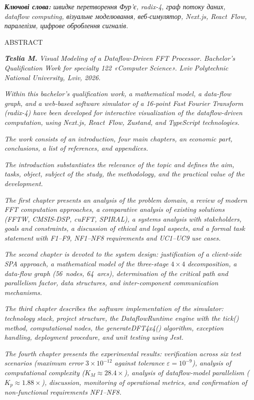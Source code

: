 \emph{\textbf{Ключові слова:} швидке перетворення Фур'є, radix-4, граф
потоку даних, dataflow computing, візуальне моделювання, веб-симулятор,
Next.js, React~Flow, паралелізм, цифрове оброблення сигналів.}

\protect{}\label{_Toc229682901}{}ABSTRACT

\emph{\textbf{Teslia M.} Visual Modeling of a Dataflow-Driven FFT
Processor. Bachelor's Qualification Work for specialty 122 «Computer
Science». Lviv Polytechnic National University, Lviv, 2026.}

\emph{Within this bachelor's qualification work, a mathematical model, a
data-flow graph, and a web-based software simulator of a 16-point Fast
Fourier Transform (radix-4) have been developed for interactive
visualization of the dataflow-driven computation, using Next.js,
React~Flow, Zustand, and TypeScript technologies.}

\emph{The work consists of an introduction, four main chapters, an
economic part, conclusions, a list of references, and appendices.}

\emph{The introduction substantiates the relevance of the topic and
defines the aim, tasks, object, subject of the study, the methodology,
and the practical value of the development.}

\emph{The first chapter presents an analysis of the problem domain, a
review of modern FFT computation approaches, a comparative analysis of
existing solutions (FFTW, CMSIS-DSP, cuFFT, SPIRAL), a systems analysis
with stakeholders, goals and constraints, a discussion of ethical and
legal aspects, and a formal task statement with F1--F9, NF1--NF8
requirements and UC1--UC9 use cases.}

\emph{The second chapter is devoted to the system design: justification
of a client-side SPA approach, a mathematical model of the three-stage}
\(4 \times 4\) \emph{decomposition, a data-flow graph (56~nodes,
64~arcs), determination of the critical path and parallelism factor,
data structures, and inter-component communication mechanisms.}

\emph{The third chapter describes the software implementation of the
simulator: technology stack, project structure, the DataflowRuntime
engine with the tick() method, computational nodes, the generateDFT4x4()
algorithm, exception handling, deployment procedure, and unit testing
using Jest.}

\emph{The fourth chapter presents the experimental results: verification
across six test scenarios (maximum error} \(3 \times 10^{- 12}\)
\emph{against tolerance} \(\varepsilon = 10^{- 9}\)\emph{), analysis of
computational complexity (}\(K_{M} \approx 28.4 \times\)\emph{),
analysis of dataflow-model parallelism
(}\(K_{p} \approx 1.88 \times\)\emph{), discussion, monitoring of
operational metrics, and confirmation of non-functional requirements
NF1--NF8.}

